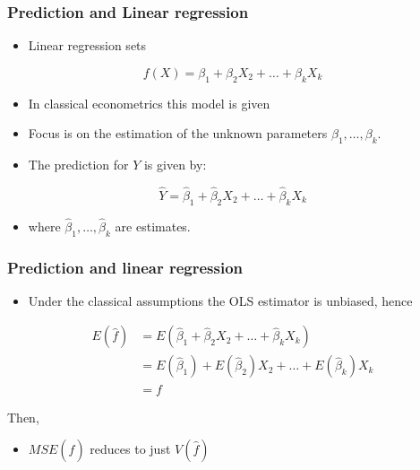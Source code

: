\documentclass[
  shownotes,
  xcolor={svgnames},
  hyperref={colorlinks,citecolor=DarkBlue,linkcolor=DarkRed,urlcolor=DarkBlue}
  ]{beamer}
\begin{document}
\begin{frame}
\frametitle{Prediction and Linear regression}

\begin{itemize}
  \item Linear regression sets 
\end{itemize}
\bigskip
\begin{equation}\label{eq:3_1_7}
f(X)= \beta_1 +\beta_2 X_2 +\dots+\beta_k X_k
\end{equation}

\bigskip
\begin{itemize}
  \item In classical econometrics this model is given
  \item Focus is on the estimation of the unknown parameters $\beta_1,\dots,\beta_k$. 
  \item The prediction for $Y$ is given by:
\end{itemize}

\begin{equation}\label{eq:3_1_8}
\hat{Y} = \hat{\beta}_1 + \hat{\beta}_2 X_2 + \dots + \hat{\beta}_k X_k
\end{equation}

\bigskip
\begin{itemize}
  \item where $\hat{\beta}_1,\dots,\hat{\beta}_k$ are estimates. 
\end{itemize}


\end{frame}
\begin{frame}
\frametitle{Prediction and linear regression}

\begin{itemize}
  \item Under the classical assumptions the OLS estimator is unbiased, hence 
\end{itemize}

\begin{align}
  E(\hat f)&= E(\hat{\beta}_1 + \hat{\beta}_2 X_2 + \dots + \hat{\beta}_k X_k) \\ 
  &= E(\hat{\beta}_1) + E(\hat{\beta}_2) X_2 + \dots + E(\hat{\beta}_k) X_k  \\ 
  &= f
\end{align}




Then, 

\begin{itemize}
  \item $MSE(\hat f)$ reduces to just $V(\hat f)$
\end{itemize} 


\end{frame}
\end{document}
